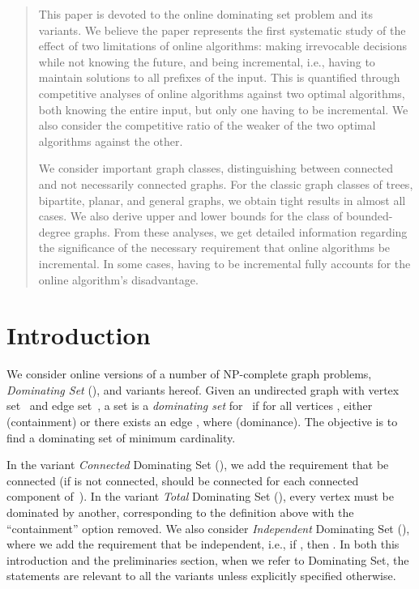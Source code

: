 \date{Received: date / Accepted: date}


\maketitle

\begin{abstract}
This paper is devoted to the online dominating set problem and its
variants.
We believe the paper represents the first systematic study of
the effect of two limitations of online algorithms:
making irrevocable decisions while not knowing the future,
and being incremental,
i.e., having to maintain solutions to all prefixes of the input.
This is quantified through competitive analyses of online algorithms
against two optimal algorithms, both knowing the entire input,
but only one having to be incremental.
We also consider the competitive ratio of the weaker of the two optimal
algorithms against the other.

We consider important graph classes,
distinguishing between connected and not necessarily connected graphs.
For the classic graph classes of trees, bipartite, planar, and general
graphs, we obtain tight results in almost all cases.
We also derive upper and lower bounds for the class of bounded-degree graphs.
From these analyses, we get detailed information regarding the 
significance of the necessary requirement that online algorithms be
incremental. In some cases, having to be incremental
fully accounts for the online algorithm's disadvantage.
\end{abstract}

\section{Introduction}
We consider online versions of a number of NP-complete graph problems,
\emph{Dominating Set} (\ds), and variants hereof.
Given an undirected graph  with vertex set~ and edge set~,
a set  is a \emph{dominating set} for~ if for all
vertices , either  (containment) or there exists an edge
, where  (dominance).
The objective is to find a dominating set of minimum cardinality.

In the variant \emph{Connected} Dominating Set (\cds), we add the requirement
that  be connected (if  is not connected,  should be connected
for each connected component of~).
In the variant \emph{Total} Dominating Set (\tds),
every vertex must be dominated
by another, corresponding to the definition above with the
``containment'' option removed.
We also consider \emph{Independent} Dominating Set (\ids), where we add
the requirement that  be independent, i.e., if ,
then .
In both this introduction and the preliminaries section, 
when we refer to Dominating Set, the statements 
are relevant to all the variants unless explicitly specified otherwise.

